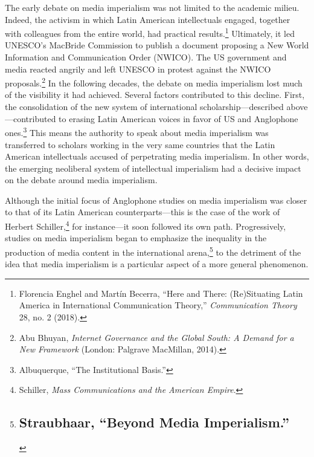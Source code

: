 \documentclass{tufte-handout}
\begin{document}
The early debate on media imperialism was not limited to the academic
milieu. Indeed, the activism in which Latin American intellectuals
engaged, together with colleagues from the entire world, had practical
results.\footnote{Florencia Enghel and Martín Becerra, ``Here and There:
  (Re)Situating Latin America in International Communication Theory,''
  \emph{Communication Theory} 28, no. 2 (2018).} Ultimately, it led
UNESCO's MacBride Commission to publish a document proposing a New World
Information and Communication Order (NWICO). The US government and media
reacted angrily and left UNESCO in protest against the NWICO
proposals.\footnote{Abu Bhuyan, \emph{Internet Governance and the Global
  South: A Demand for a New Framework} (London: Palgrave MacMillan,
  2014).} In the following decades, the debate on media imperialism lost
much of the visibility it had achieved. Several factors contributed to
this decline. First, the consolidation of the new system of
international scholarship---described above---contributed to erasing
Latin American voices in favor of US and Anglophone ones.\footnote{Albuquerque,
  ``The Institutional Basis.''} This means the authority to speak about
media imperialism was transferred to scholars working in the very same
countries that the Latin American intellectuals accused of perpetrating
media imperialism. In other words, the emerging neoliberal system of
intellectual imperialism had a decisive impact on the debate around
media imperialism.

Although the initial focus of Anglophone studies on media imperialism
was closer to that of its Latin American counterparts---this is the case
of the work of Herbert Schiller,\footnote{Schiller, \emph{Mass
  Communications and the American Empire}.} for instance---it soon
followed its own path. Progressively, studies on media imperialism began
to emphasize the inequality in the production of media content in the
international arena,\footnote{\hypertarget{straubhaar-beyond-media-imperialism.}{%
  \section{Straubhaar, ``Beyond Media
  Imperialism.''}\label{straubhaar-beyond-media-imperialism.}}} to the
detriment of the idea that media imperialism is a particular aspect of a
more general phenomenon.
\end{document}
